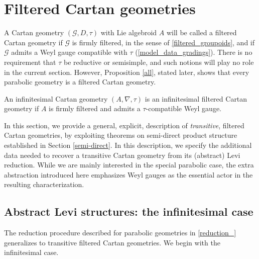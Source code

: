 \documentclass[leqno,12pt]{amsart} %
\newcommand\refreshpage{\newpage}
\newcommand\refreshpage{}
\begin{document}

\refreshpage
\section{Filtered Cartan geometries}\label{filtered_cartan}
A Cartan geometry $({\mathcal G}, D, \tau)$ with Lie algebroid $A$ will be called a {\df
  filtered Cartan geometry} if ${\mathcal G} $ is firmly filtered, in the sense of
\ref{filtered_groupoids}, and if ${\mathcal G}$ admits a Weyl gauge compatible with
$\tau $ (\ref{model_data_gradings}).  There is no requirement that $\tau $ be reductive or
semisimple, and such notions will play no role in the current section. However,
Proposition \ref{all}, stated later, shows that every parabolic geometry is a filtered
Cartan geometry.

An infinitesimal Cartan geometry $(A, \nabla, \tau)$ is an {\df infinitesimal filtered
  Cartan geometry} if $A$ is firmly filtered and admits a $\tau$-compatible Weyl gauge.

In this section, we provide a general, explicit, description of {\em transitive}, filtered
Cartan geometries, by exploiting theorems on semi-direct product structure established in
Section \ref{semi-direct}. In this description, we specify the additional data needed to
recover a transitive Cartan geometry from its (abstract) Levi reduction. While we are
mainly interested in the special parabolic case, the extra abstraction introduced here
emphasizes Weyl gauges as the essential actor in the resulting characterization.

\subsection{Abstract Levi structures: the infinitesimal case}\label{inflevi}
The reduction procedure described for parabolic geometries in \ref{reduction_} generalizes
to transitive filtered Cartan geometries. We begin with the infinitesimal case.
\end{document}
